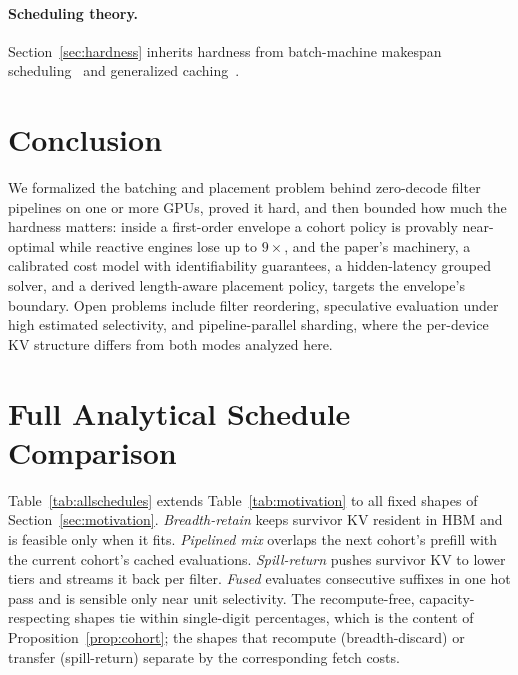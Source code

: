 \documentclass[10pt,twocolumn]{article}
\begin{document}
\paragraph{Scheduling theory.} Section~\ref{sec:hardness} inherits hardness from batch-machine makespan scheduling~\cite{uzsoy} and generalized caching~\cite{cachinghard}.

\section{Conclusion}
\label{sec:conclusion}

We formalized the batching and placement problem behind zero-decode filter pipelines on one or more GPUs, proved it hard, and then bounded how much the hardness matters: inside a first-order envelope a cohort policy is provably near-optimal while reactive engines lose up to $9\times$, and the paper's machinery, a calibrated cost model with identifiability guarantees, a hidden-latency grouped solver, and a derived length-aware placement policy, targets the envelope's boundary. Open problems include filter reordering, speculative evaluation under high estimated selectivity, and pipeline-parallel sharding, where the per-device KV structure differs from both modes analyzed here.

\appendix
\section{Full Analytical Schedule Comparison}
\label{app:schedules}

Table~\ref{tab:allschedules} extends Table~\ref{tab:motivation} to all fixed shapes of Section~\ref{sec:motivation}. \emph{Breadth-retain} keeps survivor KV resident in HBM and is feasible only when it fits. \emph{Pipelined mix} overlaps the next cohort's prefill with the current cohort's cached evaluations. \emph{Spill-return} pushes survivor KV to lower tiers and streams it back per filter. \emph{Fused} evaluates consecutive suffixes in one hot pass and is sensible only near unit selectivity. The recompute-free, capacity-respecting shapes tie within single-digit percentages, which is the content of Proposition~\ref{prop:cohort}; the shapes that recompute (breadth-discard) or transfer (spill-return) separate by the corresponding fetch costs.
\end{document}
